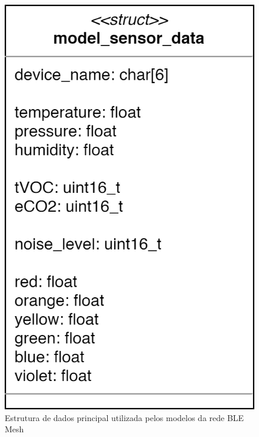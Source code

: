 \documentclass[../monografia.tex]{subfiles}
\begin{document}
\begin{figure}[h!]
	\centering
	\includegraphics[scale=0.3]{ble-mesh-code-struct.png}
	\caption{Estrutura de dados principal utilizada pelos modelos da rede BLE Mesh}
	\label{fig:ble-mesh-code-struct}
\end{figure}

		
	
\end{document}
